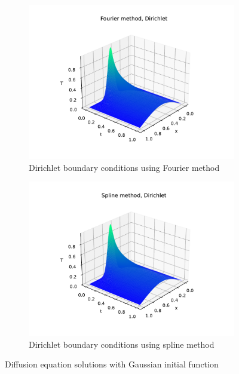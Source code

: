 \documentclass[12pt, a4paper]{article}
\begin{document}
\begin{figure}[hbtp]
\begin{subfigure}{0.5\textwidth}
  \includegraphics[width=\linewidth]{graphs/1_exercise/fourier_gauss_dirichlet.pdf}
  \caption{Dirichlet boundary conditions using Fourier method} \label{fig:c}
  \end{subfigure}
  \hspace*{\fill}
  \begin{subfigure}{0.5\textwidth}
  \includegraphics[width=\linewidth]{graphs/1_exercise/spline_gauss_dirichlet.pdf}
  \caption{Dirichlet boundary conditions using spline method} \label{fig:d}
  \end{subfigure} 
  \caption{Diffusion equation solutions with Gaussian initial function} \label{fig:1}
\end{figure} 
\end{document}
